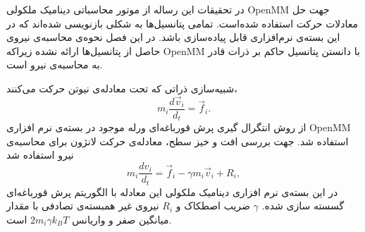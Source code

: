 در تحقیقات این رساله از موتور محاسباتی دینامیک ملکولی
OpenMM\cite{OpenMM2017}
جهت حل معادلات حرکت استفاده شده‌است. تمامی پتانسیل‌ها به شکلی بازنویسی شده‌اند که در این بسته‌ی نرم‌افزاری قابل پیاده‌سازی باشد. در این فصل نحوه‌ی محاسبه‌ی نیروی حاصل از پتانسیل‌ها ارائه نشده زیراکه 
OpenMM
با دانستن پتانسیل حاکم بر ذرات قادر به محاسبه‌ی نیرو است. 


شبیه‌سازی ذراتی که تحت معادله‌ی نیوتن حرکت می‌کنند، 
\begin{equation}
m_i\frac{d\vec v_i}{d_t}=\vec f_i.
\label{eq:newton}
\end{equation}
از روش انتگرال گیری پرش قورباغه‌‌ای ورله موجود در بسته‌ی نرم افزاری 
OpenMM
استفاده شد. جهت بررسی افت و خیز سطح، معادله‌ی حرکت لانژون برای محاسبه‌ی نیرو استفاده شد
 \begin{equation}
m_i\frac{dv_i}{d_t}=\vec f_i -\gamma m_i\vec v_i+R_i,
\label{eq:newton}
\end{equation}
در این بسته‌ی نرم افزاری دینامیک ملکولی این معادله با الگوریتم پرش قورباغه‌ای 
\cite{IZAGUIRRE2009}
گسسته سازی شده. 
$\gamma$
ضریب اصطکاک و 
$R_i$
نیروی غیر همبسته‌ی تصادفی با مقدار میانگین صفر و واریانس
$2m_i\gamma k_BT$
است. 